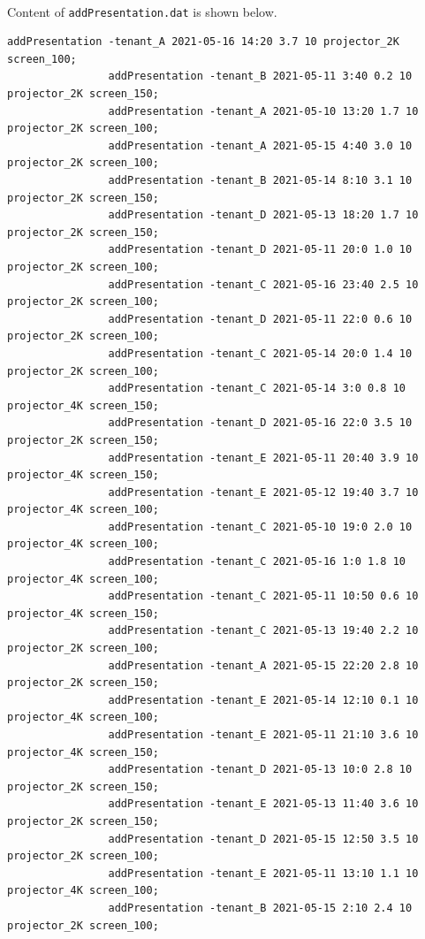 \documentclass{article}
\begin{document}
            \paragraph{}
                Content of \texttt{addPresentation.dat} is shown below.
            \begin{Verbatim}[gobble=8]
                addPresentation -tenant_A 2021-05-16 14:20 3.7 10 projector_2K screen_100;
                addPresentation -tenant_B 2021-05-11 3:40 0.2 10 projector_2K screen_150;
                addPresentation -tenant_A 2021-05-10 13:20 1.7 10 projector_2K screen_100;
                addPresentation -tenant_A 2021-05-15 4:40 3.0 10 projector_2K screen_100;
                addPresentation -tenant_B 2021-05-14 8:10 3.1 10 projector_2K screen_150;
                addPresentation -tenant_D 2021-05-13 18:20 1.7 10 projector_2K screen_150;
                addPresentation -tenant_D 2021-05-11 20:0 1.0 10 projector_2K screen_100;
                addPresentation -tenant_C 2021-05-16 23:40 2.5 10 projector_2K screen_100;
                addPresentation -tenant_D 2021-05-11 22:0 0.6 10 projector_2K screen_100;
                addPresentation -tenant_C 2021-05-14 20:0 1.4 10 projector_2K screen_100;
                addPresentation -tenant_C 2021-05-14 3:0 0.8 10 projector_4K screen_150;
                addPresentation -tenant_D 2021-05-16 22:0 3.5 10 projector_2K screen_150;
                addPresentation -tenant_E 2021-05-11 20:40 3.9 10 projector_4K screen_150;
                addPresentation -tenant_E 2021-05-12 19:40 3.7 10 projector_4K screen_100;
                addPresentation -tenant_C 2021-05-10 19:0 2.0 10 projector_4K screen_100;
                addPresentation -tenant_C 2021-05-16 1:0 1.8 10 projector_4K screen_100;
                addPresentation -tenant_C 2021-05-11 10:50 0.6 10 projector_4K screen_150;
                addPresentation -tenant_C 2021-05-13 19:40 2.2 10 projector_2K screen_100;
                addPresentation -tenant_A 2021-05-15 22:20 2.8 10 projector_2K screen_150;
                addPresentation -tenant_E 2021-05-14 12:10 0.1 10 projector_4K screen_100;
                addPresentation -tenant_E 2021-05-11 21:10 3.6 10 projector_4K screen_150;
                addPresentation -tenant_D 2021-05-13 10:0 2.8 10 projector_2K screen_150;
                addPresentation -tenant_E 2021-05-13 11:40 3.6 10 projector_2K screen_150;
                addPresentation -tenant_D 2021-05-15 12:50 3.5 10 projector_2K screen_100;
                addPresentation -tenant_E 2021-05-11 13:10 1.1 10 projector_4K screen_100;
                addPresentation -tenant_B 2021-05-15 2:10 2.4 10 projector_2K screen_100;

\end{Verbatim}
\end{document}
